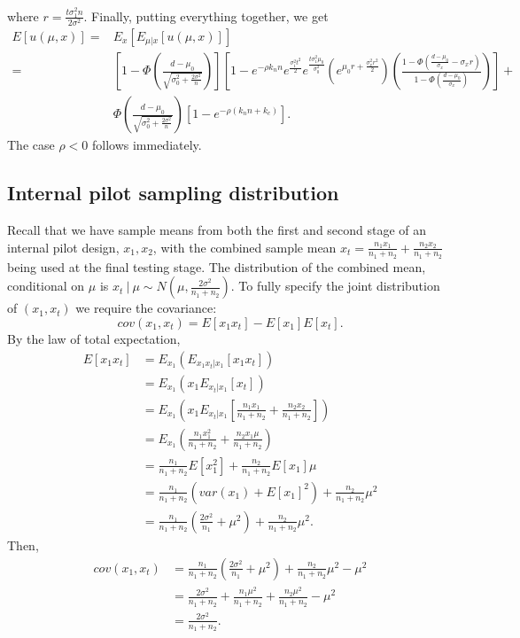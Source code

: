 \documentclass[sagev]{sagej}
\begin{document}
where $r = \frac{t \sigma_1^2 n}{2\sigma^2}$. Finally, putting everything together, we get
\begin{align*}
E[u(\mu, x)] =& E_x\left[ E_{\mu | x} [u(\mu, x)] \right] \\
 =& \left[ 1- \Phi\left(\frac{d-\mu_0}{\sqrt{\sigma_0^2 + \frac{2\sigma^2}{n}}} \right)  \right] \left[ 1 - e^{-\rho k_n n} e^{\frac{\sigma_1^2 t^2}{2}} e^{\frac{t\sigma_1^2 \mu_0}{\sigma_0^2}} \left( e^{\mu_0 r + \frac{\sigma_x^2 r^2}{2} } \right) \left(\frac{1 - \Phi(\frac{d-\mu_0}{\sigma_x} - \sigma_x r)}{1 - \Phi(\frac{d-\mu_0}{\sigma_x})} \right)  \right] + \\
 & \Phi\left(\frac{d-\mu_0}{\sqrt{\sigma_0^2 + \frac{2\sigma^2}{n}}} \right) \left[1 - e^{-\rho(k_n n + k_c)}\right].
\end{align*}
The case $\rho < 0$ follows immediately.

\subsection*{Internal pilot sampling distribution}

Recall that we have sample means from both the first and second stage of an internal pilot design, $x_1, x_2$, with the combined sample mean $x_t = \frac{n_1 x_1}{n_1 + n_2} + \frac{n_2 x_2}{n_1 + n_2}$ being used at the final testing stage. The distribution of the combined mean, conditional on $\mu$ is $x_t ~|~ \mu \sim N\left( \mu, \frac{2\sigma^2}{n_1 + n_2} \right)$. To fully specify the joint distribution of $(x_1, x_t)$ we require the covariance:
$$
cov(x_1, x_t) = E[x_1 x_t] - E[x_1] E[x_t].
$$
By the law of total expectation,
\begin{align*}
E[x_1 x_t] &= E_{x_1} ( E_{x_1 x_t | x_1}[x_1 x_t] ) \\
&= E_{x_1} ( x_1 E_{x_t | x_1}[x_t] ) \\
&= E_{x_1} \left( x_1 E_{x_t | x_1}\left[\frac{n_1 x_1}{n_1 + n_2} + \frac{n_2 x_2}{n_1 + n_2}\right] \right) \\
&= E_{x_1} \left( \frac{n_1 x_1^2}{n_1 + n_2} + \frac{n_2 x_1 \mu}{n_1 + n_2} \right) \\
&= \frac{n_1}{n_1 + n_2} E[x_1^2] + \frac{n_2}{n_1 + n_2} E[x_1] \mu \\
&= \frac{n_1}{n_1 + n_2} (var(x_1) + E[x_1]^2) + \frac{n_2}{n_1 + n_2} \mu^2 \\
&= \frac{n_1}{n_1 + n_2} \left(\frac{2\sigma^2}{n_1} + \mu^2\right) + \frac{n_2}{n_1 + n_2} \mu^2.
\end{align*}
Then,
\begin{align*}
cov(x_1, x_t) &= \frac{n_1}{n_1 + n_2} \left(\frac{2\sigma^2}{n_1} + \mu^2\right) + \frac{n_2}{n_1 + n_2} \mu^2 - \mu^2 \\
&= \frac{2\sigma^2}{n_1 + n_2} + \frac{n_1 \mu^2}{n_1 + n_2} + \frac{n_2 \mu^2}{n_1 + n_2} - \mu^2 \\
&= \frac{2\sigma^2}{n_1 + n_2} .
\end{align*}
\end{document}
